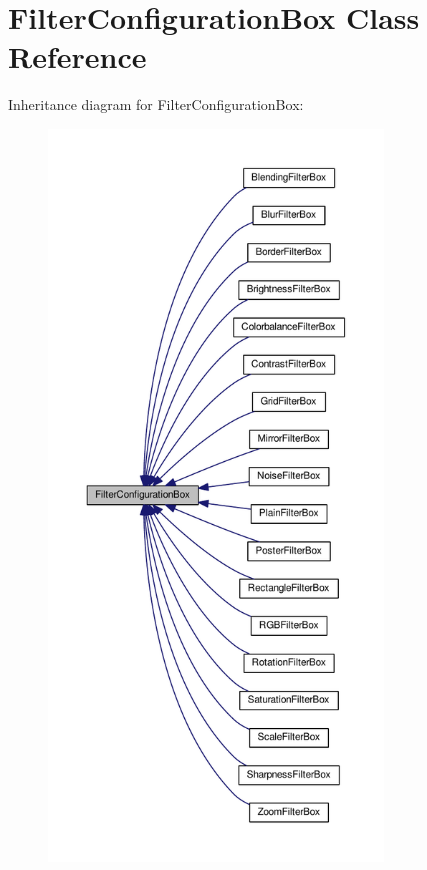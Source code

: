 \hypertarget{classGUI_1_1FilterConfigurationBox}{}\section{Filter\+Configuration\+Box Class Reference}
\label{classGUI_1_1FilterConfigurationBox}


Inheritance diagram for Filter\+Configuration\+Box\+:
\nopagebreak
\begin{figure}[H]
\begin{center}
\leavevmode
\includegraphics[height=550pt]{classGUI_1_1FilterConfigurationBox__inherit__graph}
\end{center}
\end{figure}
